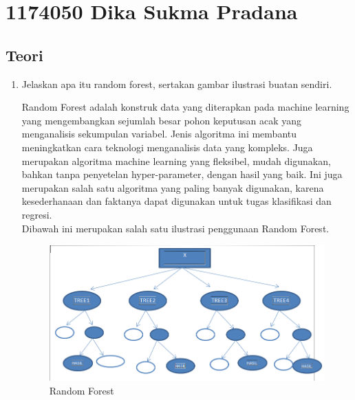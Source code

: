 \section{1174050 Dika Sukma Pradana}

\subsection{Teori}
\begin{enumerate}
\item Jelaskan apa itu random forest, sertakan gambar ilustrasi buatan sendiri.\par
Random Forest adalah konstruk data yang diterapkan pada machine learning yang mengembangkan sejumlah besar pohon keputusan acak yang menganalisis sekumpulan variabel. Jenis algoritma ini membantu meningkatkan cara teknologi menganalisis data yang kompleks. Juga merupakan algoritma machine learning yang fleksibel, mudah digunakan, bahkan tanpa penyetelan hyper-parameter, dengan hasil yang baik. Ini juga merupakan salah satu algoritma yang paling banyak digunakan, karena kesederhanaan dan faktanya dapat digunakan untuk tugas klasifikasi dan regresi.\\
Dibawah ini merupakan salah satu ilustrasi penggunaan Random Forest.
\begin{figure}[ht]
\centering
\includegraphics[scale=0.5]{figures/1174050/chapter3/3.PNG}
\caption{Random Forest}
\label{contoh}
\end{figure}


\end{enumerate}

